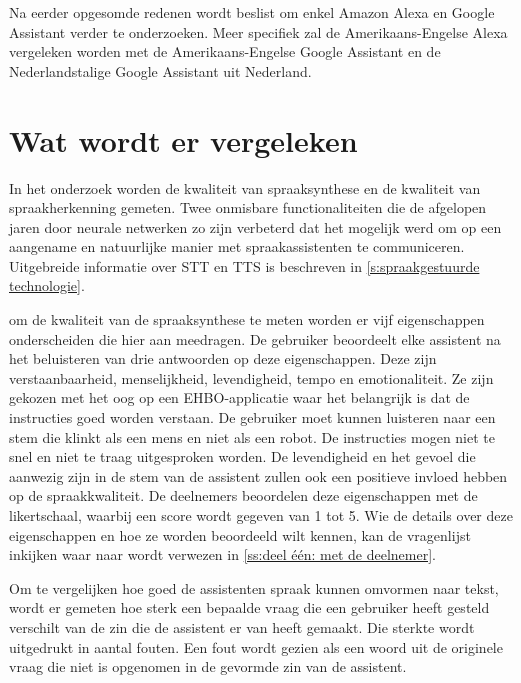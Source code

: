 Na eerder opgesomde redenen wordt beslist om enkel Amazon Alexa en Google Assistant verder te onderzoeken. Meer specifiek zal de Amerikaans-Engelse Alexa vergeleken worden met de Amerikaans-Engelse Google Assistant en de Nederlandstalige Google Assistant uit Nederland.

\section{Wat wordt er vergeleken}
\label{sec:vergelijking van stemgestuurde assistenten}
In het onderzoek worden de kwaliteit van spraaksynthese en de kwaliteit van spraakherkenning gemeten. Twee onmisbare functionaliteiten die de afgelopen jaren door neurale netwerken zo zijn verbeterd dat het mogelijk werd om op een aangename en natuurlijke manier met spraakassistenten te communiceren. Uitgebreide informatie over \gls{STT} en \gls{TTS} is beschreven in \ref{s:spraakgestuurde technologie}.

om de kwaliteit van de spraaksynthese te meten worden er vijf eigenschappen onderscheiden die hier aan meedragen. De gebruiker beoordeelt elke assistent na het beluisteren van drie antwoorden op deze eigenschappen. Deze zijn verstaanbaarheid, menselijkheid, levendigheid, tempo en emotionaliteit. Ze zijn gekozen met het oog op een EHBO-applicatie waar het belangrijk is dat de instructies goed worden verstaan. De gebruiker moet kunnen luisteren naar een stem die klinkt als een mens en niet als een robot. De instructies mogen niet te snel en niet te traag uitgesproken worden. De levendigheid en het gevoel die aanwezig zijn in de stem van de assistent zullen ook een positieve invloed hebben op de spraakkwaliteit. De deelnemers beoordelen deze eigenschappen met de likertschaal, waarbij een score wordt gegeven van 1 tot 5. Wie de details over deze eigenschappen en hoe ze worden beoordeeld wilt kennen, kan de vragenlijst inkijken waar naar wordt verwezen in \ref{ss:deel één: met de deelnemer}.

Om te vergelijken hoe goed de assistenten spraak kunnen omvormen naar tekst, wordt er gemeten hoe sterk een bepaalde vraag die een gebruiker heeft gesteld verschilt van de zin die de assistent er van heeft gemaakt. Die sterkte wordt uitgedrukt in aantal fouten. Een fout wordt gezien als een woord uit de originele vraag die niet is opgenomen in de gevormde zin van de assistent.

